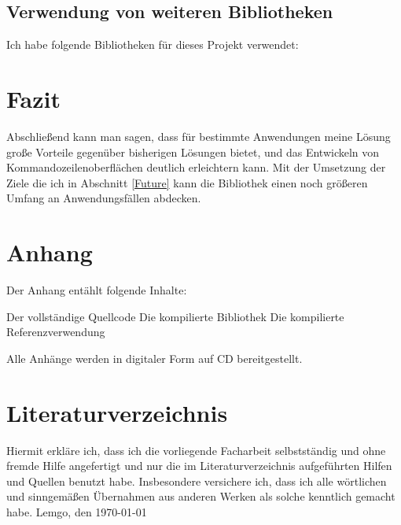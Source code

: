 \documentclass[a4paper,11pt,titlepage,ngerman]{article}
\newcommand{\inlinecode}[1]{{\lstinline[language=]$#1$}}
\begin{document}
\begin{sloppypar}
  \subsection{Verwendung von weiteren Bibliotheken}\label{subsec:UsageOfLibraries}
  Ich habe folgende Bibliotheken für dieses Projekt verwendet:
  \section{Fazit}\label{sec:Conclusion}
Abschlie\ss end kann man sagen, dass für bestimmte Anwendungen meine Lösung gro\ss e Vorteile 
gegenüber bisherigen Lösungen bietet, und das Entwickeln von Kommandozeilenoberflächen deutlich 
erleichtern kann. Mit der Umsetzung der Ziele die ich in Abschnitt \ref{Future} kann die Bibliothek 
einen noch grö\ss eren Umfang an Anwendungsfällen abdecken. 
  \section{Anhang}\label{sec:Attachments}
  Der Anhang entählt folgende Inhalte:
  \begin{outline}
   \1 Der vollständige Quellcode
   \1 Die kompilierte Bibliothek
   \1 Die kompilierte Referenzverwendung
  \end{outline}
  Alle Anhänge werden in digitaler Form auf CD bereitgestellt.
  \section{Literaturverzeichnis}\label{sec:Literature}
  \printbibliography[heading=none]
  \newpage
  \begin{samepage}
	\thispagestyle{empty}
	Hiermit erkläre ich, dass ich die vorliegende Facharbeit selbstständig und ohne fremde Hilfe angefertigt und nur die im Literaturverzeichnis
	aufgeführten Hilfen und Quellen benutzt habe.
	Insbesondere versichere ich, dass ich alle wörtlichen
	und sinngemä\ss en Übernahmen aus anderen Werken als solche kenntlich gemacht habe.
	\medbreak
	Lemgo, den \today
	\medbreak
  \end{samepage}
 \end{sloppypar}
\end{document}
